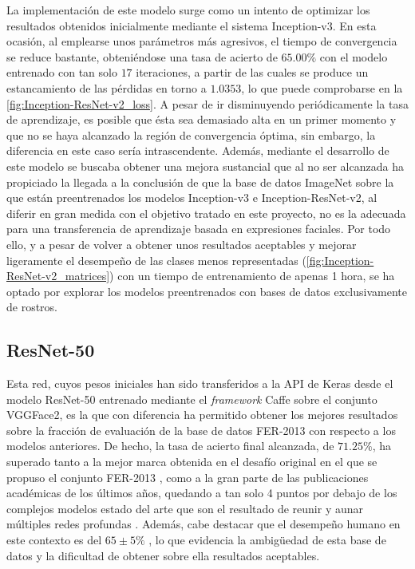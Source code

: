La implementación de este modelo surge como un intento de optimizar los resultados obtenidos inicialmente mediante el sistema Inception-v3. En esta ocasión, al emplearse unos parámetros más agresivos, el tiempo de convergencia se reduce bastante, obteniéndose una tasa de acierto de $65.00\%$ con el modelo entrenado con tan solo $17$ iteraciones, a partir de las cuales se produce un estancamiento de las pérdidas en torno a $1.0353$, lo que puede comprobarse en la \autoref{fig:Inception-ResNet-v2_loss}. A pesar de ir disminuyendo periódicamente la tasa de aprendizaje, es posible que ésta sea demasiado alta en un primer momento y que no se haya alcanzado la región de convergencia óptima, sin embargo, la diferencia en este caso sería intrascendente. Además, mediante el desarrollo de este modelo se buscaba obtener una mejora sustancial que al no ser alcanzada ha propiciado la llegada a la conclusión de que la base de datos ImageNet sobre la que están preentrenados los modelos Inception-v3 e Inception-ResNet-v2, al diferir en gran medida con el objetivo tratado en este proyecto, no es la adecuada para una transferencia de aprendizaje basada en expresiones faciales. Por todo ello, y a pesar de volver a obtener unos resultados aceptables y mejorar ligeramente el desempeño de las clases menos representadas (\autoref{fig:Inception-ResNet-v2_matrices}) con un tiempo de entrenamiento de apenas 1 hora, se ha optado por explorar los modelos preentrenados con bases de datos exclusivamente de rostros.

\subsection{ResNet-50}

Esta red, cuyos pesos iniciales han sido transferidos a la API de Keras desde el modelo ResNet-50 entrenado mediante el \textit{framework} Caffe sobre el conjunto VGGFace2, es la que con diferencia ha permitido obtener los mejores resultados sobre la fracción de evaluación de la base de datos FER-2013 con respecto a los modelos anteriores. De hecho, la tasa de acierto final alcanzada, de $71.25\%$, ha superado tanto a la mejor marca obtenida en el desafío original en el que se propuso el conjunto FER-2013 \cite{FER-2013}, como a la gran parte de las publicaciones académicas de los últimos años, quedando a tan solo 4 puntos por debajo de los complejos modelos estado del arte que son el resultado de reunir y aunar múltiples redes profundas \cite{Pramerdorfer}. Además, cabe destacar que el desempeño humano en este contexto es del $65\pm 5\%$ \cite{FER-2013_human_acc}, lo que evidencia la ambigüedad de esta base de datos y la dificultad de obtener sobre ella resultados aceptables.

